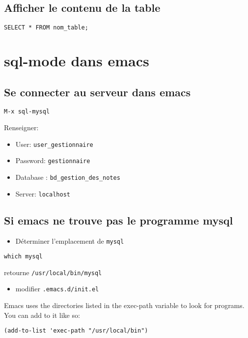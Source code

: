 \documentclass[11pt]{article}
\begin{document}
\subsection{Afficher le contenu de la table}
\label{sec:org27f95a5}
\begin{verbatim}
SELECT * FROM nom_table;
\end{verbatim}

\section{sql-mode dans emacs}
\label{sec:org6e5063d}

\subsection{Se connecter au serveur dans emacs}
\label{sec:org6d530c8}

\texttt{M-x sql-mysql}

Renseigner:
\begin{itemize}
\item User: \texttt{user\_gestionnaire}
\item Password: \texttt{gestionnaire}
\item Database : \texttt{bd\_gestion\_des\_notes}
\item Server: \texttt{localhost}
\end{itemize}

\subsection{Si emacs ne trouve pas le programme mysql}
\label{sec:org841813a}
\begin{itemize}
\item Déterminer l'emplacement de \texttt{mysql}
\end{itemize}
\begin{verbatim}
which mysql
\end{verbatim}
retourne \texttt{/usr/local/bin/mysql}

\begin{itemize}
\item modifier \texttt{.emacs.d/init.el}
\end{itemize}
Emacs uses the directories listed in the exec-path variable to look for programs. You can add to it like so:

\begin{verbatim}
(add-to-list 'exec-path "/usr/local/bin")
\end{verbatim}
\end{document}
